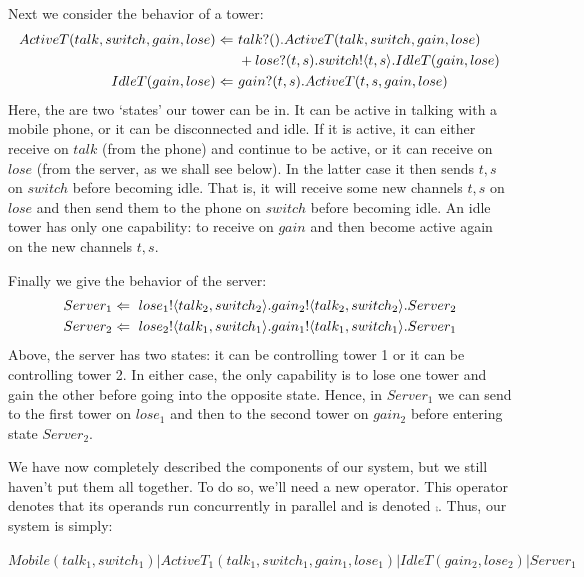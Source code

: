 	Next we consider the behavior of a tower:
	\begin{align*}
		ActiveT(talk,switch,gain,lose) \Leftarrow\  & {talk}?({}).ActiveT(talk,switch,gain,lose) \\  
		 & +{lose}?({t,s}).{switch}!\langle{t,s}\rangle.IdleT(gain, lose)\\
		IdleT(gain,lose) \Leftarrow\  & {gain}?({t,s}).ActiveT(t,s,gain,lose)\\
	\end{align*}
Here, the are two `states' our tower can be in.  
It can be active in talking with a mobile phone, or it can be disconnected and idle.  
If it is active, it can either receive on $talk$ (from the phone) and continue to be active, or it can receive on $lose$ (from the server, as we shall see below).  
In the latter case it then sends $t,s$ on $switch$ before becoming idle.  
That is, it will receive some new channels $t,s$ on $lose$ and then send them to the phone on $switch$ before becoming idle.  
An idle tower has only one capability: to receive on $gain$ and then become active again on the new channels $t,s$.

Finally we give the behavior of the server:
\begin{align*}
	Server_1 \Leftarrow\  {lose_1}!\langle{talk_2,switch_2}\rangle. {gain_2}!\langle{talk_2,switch_2}\rangle. Server_2\\
	Server_2 \Leftarrow\  {lose_2}!\langle{talk_1,switch_1}\rangle. {gain_1}!\langle{talk_1,switch_1}\rangle. Server_1
\end{align*}
Above, the server has two states: it can be controlling tower 1 or it can be controlling tower 2.  
In either case, the only capability is to lose one tower and gain the other before going into the opposite state.  
Hence, in $Server_1$ we can send to the first tower on $lose_1$ and then to the second tower on $gain_2$ before entering state $Server_2$.

We have now completely described the components of our system, but we still haven't put them all together.  
To do so, we'll need a new operator.  
This operator denotes that its operands run concurrently in parallel and is denoted $\comp$.  
Thus, our system is simply:
\begin{center}
	\small{$\textstyle Mobile(talk_1,switch_1)|ActiveT_1(talk_1,switch_1,gain_1,lose_1)|IdleT(gain_2,lose_2)|Server_1$}
\end{center}


